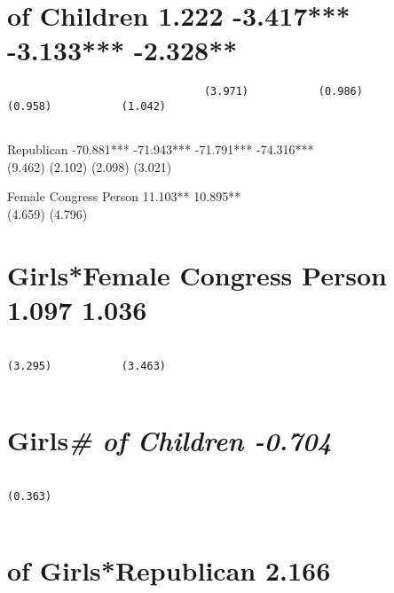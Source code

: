 \documentclass[
]{article}
\begin{document}
\hypertarget{of-children-1.222--3.417--3.133--2.328}{%
\section{of Children 1.222 -3.417*** -3.133***
-2.328**}\label{of-children-1.222--3.417--3.133--2.328}}

\begin{verbatim}
                               (3.971)           (0.986)           (0.958)           (1.042)     
                                                                                                 
\end{verbatim}

Republican -70.881*** -71.943*** -71.791*** -74.316***\\
(9.462) (2.102) (2.098) (3.021)

Female Congress Person 11.103** 10.895**\\
(4.659) (4.796)

\hypertarget{girlsfemale-congress-person-1.097-1.036}{%
\section{Girls*Female Congress Person 1.097
1.036}\label{girlsfemale-congress-person-1.097-1.036}}

\begin{verbatim}
                                                                   (3.295)           (3.463)     
                                                                                                 
\end{verbatim}

\hypertarget{girls-of-children--0.704}{%
\section{\texorpdfstring{Girls\emph{\# of Children
-0.704}}{Girls\# of Children -0.704}}\label{girls-of-children--0.704}}

\begin{verbatim}
                                                                                     (0.363)     
                                                                                                 
\end{verbatim}

\hypertarget{of-girlsrepublican-2.166}{%
\section{of Girls*Republican 2.166}\label{of-girlsrepublican-2.166}}
\end{document}

